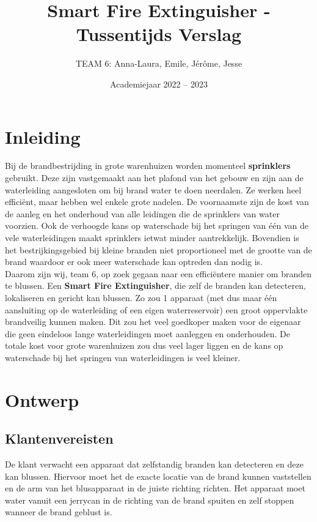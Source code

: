 \documentclass[kulak]{kulakarticle} %
\title{Smart Fire Extinguisher - Tussentijds Verslag}
\author{TEAM 6: Anna-Laura, Emile, Jérôme, Jesse}
\date{Academiejaar 2022 -- 2023}
\begin{document}
\maketitle

\tableofcontents

\section*{Inleiding}
                                          
	Bij de brandbestrijding in grote warenhuizen worden momenteel \textbf{sprinklers} gebruikt. Deze zijn vastgemaakt aan het plafond van het gebouw en zijn aan de waterleiding aangesloten om bij brand water te doen neerdalen. Ze werken heel efficiënt, maar hebben wel enkele grote nadelen. De voornaamste zijn de kost van de aanleg en het onderhoud van alle leidingen die de sprinklers van water voorzien. Ook de verhoogde kans op waterschade bij het springen van één van de vele waterleidingen maakt sprinklers ietwat minder aantrekkelijk. Bovendien is het bestrijkingsgebied bij kleine branden niet proportioneel met de grootte van de brand waardoor er ook meer waterschade kan optreden dan nodig is. \\

	Daarom zijn wij, team 6,  op zoek gegaan naar een efficiëntere manier om branden te blussen. Een \textbf{Smart Fire Extinguisher}, die zelf de branden kan detecteren, lokaliseren en gericht kan blussen. Zo zou 1 apparaat (met dus maar één aansluiting op de waterleiding of een eigen waterreservoir) een groot oppervlakte brandveilig kunnen maken. Dit zou het veel goedkoper maken voor de eigenaar die geen eindeloos lange waterleidingen moet aanleggen en onderhouden. De totale kost voor grote warenhuizen zou dus veel lager liggen en de kans op waterschade bij het springen van waterleidingen is veel kleiner.



\section{Ontwerp}

	\subsection{Klantenvereisten}

		De klant verwacht een apparaat dat zelfstandig branden kan detecteren en deze kan blussen. Hiervoor moet het de exacte locatie van de brand kunnen vaststellen en de arm van het blusapparaat in de juiste richting richten. Het apparaat moet water vanuit een jerrycan in de richting van de brand spuiten en zelf stoppen wanneer de brand geblust is. 
		
\end{document}
